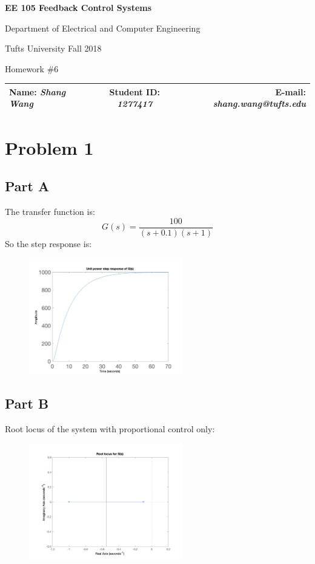 \documentclass[a4paper]{article}
\begin{document}
\begin{center}
\bf\Large
EE 105 Feedback Control Systems\par
Department of Electrical and Computer Engineering\par
Tufts University Fall 2018\par
Homework \#6\par   
\end{center}
\begin{table}[H]
\begin{center}
\begin{tabular*}{\textwidth}{@{\extracolsep{\fill}}lcr}
Name: {\it Shang Wang} &Student ID: {\it 1277417} &E-mail: {\it shang.wang@tufts.edu}\\
\hline
\end{tabular*}
\end{center}
\end{table}

\section{Problem 1}
\subsection{Part A} 
The transfer function is:
$$
G(s) = \frac{100}{(s+0.1)(s+1)}
$$
So the step response is:
\begin{figure}[H]
\centering
\includegraphics[width = 0.6\textwidth]{pic/t1.png}
\end{figure}

\subsection{Part B} 
Root locus of the system with proportional control only:
\begin{figure}[H]
\centering
\includegraphics[width = 0.6\textwidth]{pic/t2.png}
\end{figure}
\end{document}
